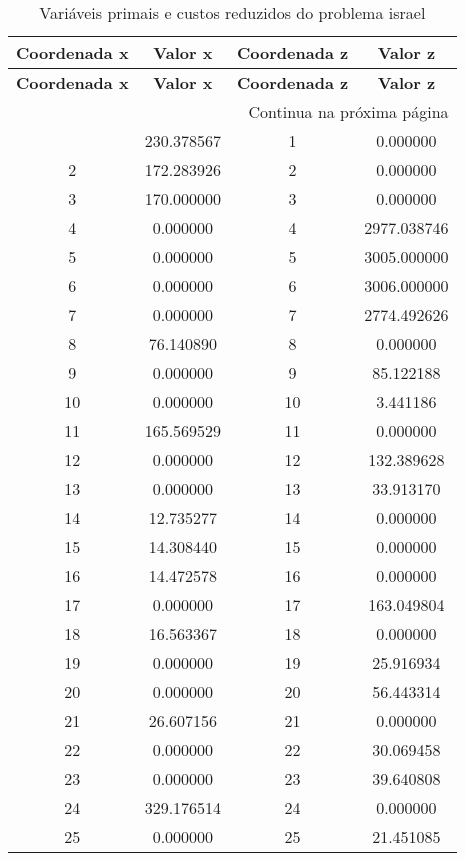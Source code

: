 \documentclass[12pt]{article}
\begin{document}
\begin{longtable}{@{}cccc@{}}
\caption{Variáveis primais e custos reduzidos do problema israel} \\
\toprule
\textbf{Coordenada x} & \textbf{Valor x} & \textbf{Coordenada z} & \textbf{Valor z} \\
\midrule
\endfirsthead

\toprule
\textbf{Coordenada x} & \textbf{Valor x} & \textbf{Coordenada z} & \textbf{Valor z} \\
\midrule
\endhead

\midrule \multicolumn{4}{r}{{Continua na próxima página}} \\ \midrule
\endfoot

\bottomrule
\endlastfoot
1 & 230.378567 & 1 & 0.000000 \\
2 & 172.283926 & 2 & 0.000000 \\
3 & 170.000000 & 3 & 0.000000 \\
4 & 0.000000 & 4 & 2977.038746 \\
5 & 0.000000 & 5 & 3005.000000 \\
6 & 0.000000 & 6 & 3006.000000 \\
7 & 0.000000 & 7 & 2774.492626 \\
8 & 76.140890 & 8 & 0.000000 \\
9 & 0.000000 & 9 & 85.122188 \\
10 & 0.000000 & 10 & 3.441186 \\
11 & 165.569529 & 11 & 0.000000 \\
12 & 0.000000 & 12 & 132.389628 \\
13 & 0.000000 & 13 & 33.913170 \\
14 & 12.735277 & 14 & 0.000000 \\
15 & 14.308440 & 15 & 0.000000 \\
16 & 14.472578 & 16 & 0.000000 \\
17 & 0.000000 & 17 & 163.049804 \\
18 & 16.563367 & 18 & 0.000000 \\
19 & 0.000000 & 19 & 25.916934 \\
20 & 0.000000 & 20 & 56.443314 \\
21 & 26.607156 & 21 & 0.000000 \\
22 & 0.000000 & 22 & 30.069458 \\
23 & 0.000000 & 23 & 39.640808 \\
24 & 329.176514 & 24 & 0.000000 \\
25 & 0.000000 & 25 & 21.451085 \\

\end{longtable}
\end{document}
